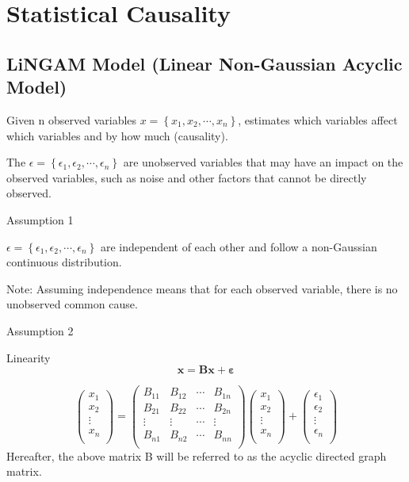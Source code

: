 \documentclass[pdftex]{article}
\begin{document}
\clearpage
\appendix
\section{Statistical Causality}
\subsection{LiNGAM Model (Linear Non-Gaussian Acyclic Model)}

Given n observed variables $x=\left\{ x_{1},x_{2},\cdots,x_{n}\right\}$, estimates which variables affect which variables and by how much (causality).

The $\epsilon=\left\{\epsilon_{1},\epsilon_{2},\cdots,\epsilon_{n}\right\}$ are unobserved variables that may have an impact on the observed variables, such as noise and other factors that cannot be directly observed.

Assumption 1 \par
$\epsilon=\left\{\epsilon_{1},\epsilon_{2},\cdots,\epsilon_{n}\right\}$ are independent of each other and follow a non-Gaussian continuous distribution.

Note: Assuming independence means that for each observed variable, there is no unobserved common cause.

Assumption 2 \par
Linearity
$$\mathbf{x} = \mathbf{\text{Bx}} + \mathbf{\varepsilon}$$

$$\begin{pmatrix}
x_{1} \\
x_{2} \\
 \vdots \\
x_{n} \\
\end{pmatrix} = \begin{pmatrix}
B_{11} & B_{12} & \cdots & B_{1n} \\
B_{21} & B_{22} & \cdots & B_{2n} \\
 \vdots & \vdots & \cdots & \vdots \\
B_{n1} & B_{n2} & \cdots & B_{nn} \\
\end{pmatrix}\begin{pmatrix}
x_{1} \\
x_{2} \\
 \vdots \\
x_{n} \\
\end{pmatrix} + \begin{pmatrix}
\epsilon_{1} \\
\epsilon_{2} \\
 \vdots \\
\epsilon_{n} \\
\end{pmatrix}$$
Hereafter, the above matrix B will be referred to as the acyclic directed graph matrix. \par
\end{document}

